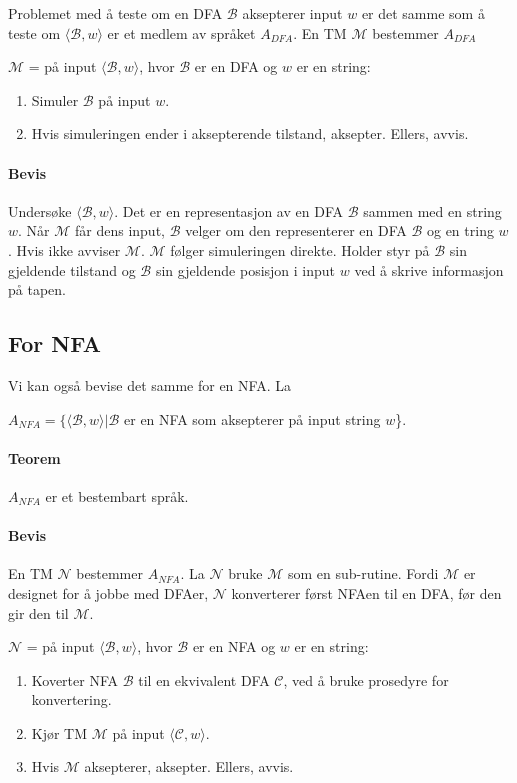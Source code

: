 \documentclass[11pt,a4paper]{article}
\begin{document}
Problemet med å teste om en DFA $\mathcal{B}$ aksepterer input $w$ er det samme som å teste om $\langle \mathcal{B},w \rangle$ er et medlem av språket $A_{DFA}$. En TM $\mathcal{M}$ bestemmer $A_{DFA}$

$\mathcal{M}$ = på input $\langle \mathcal{B},w \rangle$, hvor $\mathcal{B}$ er en DFA og $w$ er en string:
\begin{enumerate}
\item{Simuler $\mathcal{B}$ på input $w$.}
\item{Hvis simuleringen ender i aksepterende tilstand, aksepter. Ellers, avvis.}
\end{enumerate}

\paragraph{Bevis} Undersøke $\langle \mathcal{B},w \rangle$. Det er en representasjon av en DFA $\mathcal{B}$ sammen med en string $w$. Når $\mathcal{M}$ får dens input, $\mathcal{B}$ velger om den representerer en DFA $\mathcal{B}$ og en tring $w$. Hvis ikke avviser $\mathcal{M}$. $\mathcal{M}$ følger simuleringen direkte. Holder styr på $\mathcal{B}$ sin gjeldende tilstand og $\mathcal{B}$ sin gjeldende posisjon i input $w$ ved å skrive informasjon på tapen.

\subsection{For NFA}
Vi kan også bevise det samme for en NFA. La
\begin{center}
$A_{NFA} = \{\langle \mathcal{B},w \rangle | \mathcal{B}$ er en NFA som aksepterer på input string $w$\}.
\end{center}

\paragraph{Teorem} $A_{NFA}$ er et bestembart språk.
\paragraph{Bevis} En TM $\mathcal{N}$ bestemmer $A_{NFA}$. La $\mathcal{N}$ bruke $\mathcal{M}$ som en sub-rutine. Fordi $\mathcal{M}$ er designet for å jobbe med DFAer, $\mathcal{N}$ konverterer først NFAen til en DFA, før den gir den til $\mathcal{M}$.

$\mathcal{N}$ = på input $\langle \mathcal{B},w \rangle$, hvor $\mathcal{B}$ er en NFA og $w$ er en string:
\begin{enumerate}
\item{Koverter NFA $\mathcal{B}$ til en ekvivalent DFA $\mathcal{C}$, ved å bruke prosedyre for konvertering.}
\item{Kjør TM $\mathcal{M}$ på input $\langle \mathcal{C},w \rangle$}.
\item{Hvis $\mathcal{M}$ aksepterer, aksepter. Ellers, avvis.}
\end{enumerate}
\end{document}

